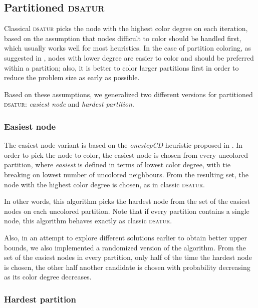 \subsection{Partitioned \textsc{dsatur}}
\label{subsec:heur:pdsatur}

Classical \textsc{dsatur} picks the node with the highest color degree on each iteration, based on the assumption that nodes difficult to color should be handled first, which usually works well for most heuristics. In the case of partition coloring, as suggested in \cite{Li00thepartition}, nodes with lower degree are easier to color and should be preferred within a partition; also, it is better to color larger partitions first in order to reduce the problem size as early as possible.

Based on these assumptions, we generalized two different versions for partitioned \textsc{dsatur}: \textit{easiest node} and \textit{hardest partition}.

\subsubsection{Easiest node}

The easiest node variant is based on the \textit{onestepCD} heuristic proposed in \cite{Li00thepartition}. In order to pick the node to color, the easiest node is chosen from every uncolored partition, where \textit{easiest} is defined in terms of lowest color degree, with tie breaking on lowest number of uncolored neighbours. From the resulting set, the node with the highest color degree is chosen, as in classic \textsc{dsatur}. 

In other words, this algorithm picks the hardest node from the set of the easiest nodes on each uncolored partition. Note that if every partition contains a single node, this algorithm behaves exactly as classic \textsc{dsatur}.

Also, in an attempt to explore different solutions earlier to obtain better upper bounds, we also implemented a randomized version of the algorithm. From the set of the easiest nodes in every partition, only half of the time the hardest node is chosen, the other half another candidate is chosen with probability decreasing as its color degree decreases.

\subsubsection{Hardest partition}

